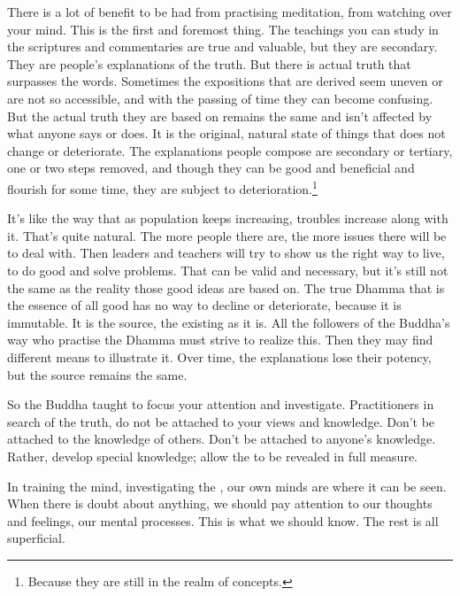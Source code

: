 There is a lot of benefit to be had from practising meditation, from watching over your mind. This is the first and foremost thing. The teachings you can study in the scriptures and commentaries are true and valuable, but they are secondary. They are people's explanations of the truth. But there is actual truth that surpasses the words. Sometimes the expositions that are derived seem uneven or are not so accessible, and with the passing of time they can become confusing. But the actual truth they are based on remains the same and isn't affected by what anyone says or does. It is the original, natural state of things that does not change or deteriorate. The explanations people compose are secondary or tertiary, one or two steps removed, and though they can be good and beneficial and flourish for some time, they are subject to deterioration.\footnote{Because they are still in the realm of concepts.}

It's like the way that as population keeps increasing, troubles increase along with it. That's quite natural. The more people there are, the more issues there will be to deal with. Then leaders and teachers will try to show us the right way to live, to do good and solve problems. That can be valid and necessary, but it's still not the same as the reality those good ideas are based on. The true Dhamma that is the essence of all good has no way to decline or deteriorate, because it is immutable. It is the source, the  existing as it is. All the followers of the Buddha's way who practise the Dhamma must strive to realize this. Then they may find different means to illustrate it. Over time, the explanations lose their potency, but the source remains the same.

So the Buddha taught to focus your attention and investigate. Practitioners in search of the truth, do not be attached to your views and knowledge. Don't be attached to the knowledge of others. Don't be attached to anyone's knowledge. Rather, develop special knowledge; allow the  to be revealed in full measure.

In training the mind, investigating the , our own minds are where it can be seen. When there is doubt about anything, we should pay attention to our thoughts and feelings, our mental processes. This is what we should know. The rest is all superficial.

